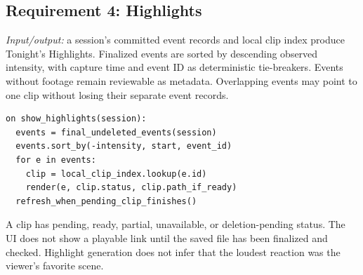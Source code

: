 \subsection{Requirement 4: Highlights}
\textit{Input/output:} a session's committed event records and local clip index produce Tonight's Highlights. Finalized events are sorted by descending observed intensity, with capture time and event ID as deterministic tie-breakers. Events without footage remain reviewable as metadata. Overlapping events may point to one clip without losing their separate event records.
\par\smallskip\noindent\begin{minipage}{\columnwidth}
\begin{lstlisting}
on show_highlights(session):
  events = final_undeleted_events(session)
  events.sort_by(-intensity, start, event_id)
  for e in events:
    clip = local_clip_index.lookup(e.id)
    render(e, clip.status, clip.path_if_ready)
  refresh_when_pending_clip_finishes()
\end{lstlisting}
\end{minipage}\par
A clip has pending, ready, partial, unavailable, or deletion-pending status. The UI does not show a playable link until the saved file has been finalized and checked. Highlight generation does not infer that the loudest reaction was the viewer's favorite scene.

